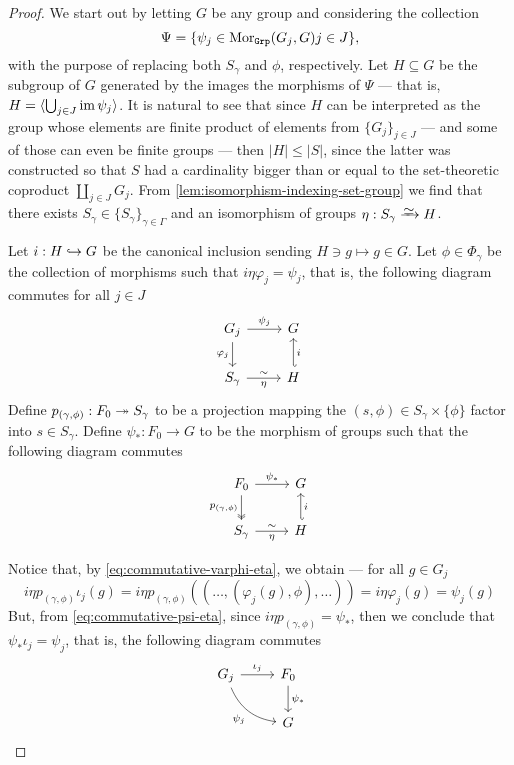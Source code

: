 \begin{proof}
We start out by letting \(G\) be any group and considering the collection
\[
  \Psi = \{\psi_{j} \in \operatorname{Mor}_{{\texttt{Grp}}}(G_j, G) \relax j \in J\},
\]
with the purpose of replacing both \(S_{\gamma}\) and \(\phi\),
respectively. Let \(H \subseteq G\) be the subgroup of \(G\) generated by the
images the morphisms of \(\Psi\) --- that is, \(H = \langle \bigcup_{j \in J}
\operatorname{im} \psi_j \rangle\). It is natural to see that since \(H\) can be interpreted
as the group whose elements are finite product of elements from \(\{G_{j}\}_{j
\in J}\) --- and some of those can even be finite groups --- then \(|H| \leq
|S|\), since the latter was constructed so that \(S\) had a cardinality bigger
than or equal to the set-theoretic coproduct \(\coprod_{j \in J} G_j\). From
\cref{lem:isomorphism-indexing-set-group} we find that there exists \(S_{\gamma}
\in \{S_{\gamma}\}_{\gamma \in \Gamma}\) and an isomorphism of groups \(\eta:
S_{\gamma} \isoto H\).

Let \(i: H \hookrightarrow G\) be the canonical inclusion sending \(H \ni g \mapsto g \in
G\). Let \(\phi \in \Phi_{\gamma}\) be the collection of morphisms such that \(i
\eta \varphi_j = \psi_j\), that is, the following diagram commutes for all \(j
\in J\)
\begin{equation*}
\label{eq:commutative-varphi-eta}
  \begin{tikzcd}
    G_j \ar[r, "\psi_j"] \ar[d, swap, "\varphi_j"] &G \\
    S_{\gamma} \ar[r, "\eta"', "\sim"] &H \ar[u, hook', swap, "i"]
  \end{tikzcd}
\end{equation*}
Define \(p_{(\gamma, \phi)}: F_0 \twoheadrightarrow S_{\gamma}\) to be a projection mapping
the \((s, \phi) \in S_{\gamma} \times \{\phi\}\) factor into \(s \in
S_{\gamma}\). Define \(\psi_{*}: F_0 \to G\) to be the morphism of groups such
that the following diagram commutes
\begin{equation*}
\label{eq:commutative-psi-eta}
  \begin{tikzcd}
    F_0 \ar[d, two heads, swap, "p_{(\gamma, \phi)}"] \ar[r, "\psi_{*}"] &G \\
    S_{\gamma} \ar[r, "\sim", "\eta"'] &H \ar[u, hook', "i"']
  \end{tikzcd}
\end{equation*}

Notice that, by \cref{eq:commutative-varphi-eta}, we obtain --- for all \(g \in
G_j\)
\[
  i \eta p_{(\gamma, \phi)} \iota_j(g)
  = i \eta p_{(\gamma, \phi)}((\dots, (\varphi_j(g), \phi), \dots))
  = i \eta \varphi_j(g)
  = \psi_j(g)
\]
But, from \cref{eq:commutative-psi-eta}, since \(i \eta p_{(\gamma, \phi)} =
\psi_{*}\), then we conclude that \(\psi_{*} \iota_j = \psi_j\), that is, the
following diagram commutes
\[
  \begin{tikzcd}
    G_j \ar[r, "\iota_j"] \ar[dr, bend right, swap, "\psi_j"]
      &F_0 \ar[d, "\psi_{*}"] \\
    &G
  \end{tikzcd}
\]


\end{proof}
